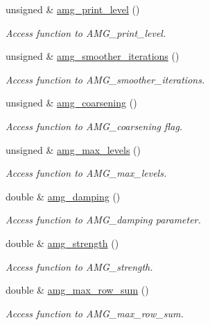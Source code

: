\begin{DoxyCompactItemize}
unsigned \& \hyperlink{classoomph_1_1HyprePreconditioner_a42a3de25133fa0816b98fcc493efc12c}{amg\+\_\+print\+\_\+level} ()
\begin{DoxyCompactList}\small\item\em Access function to A\+M\+G\+\_\+print\+\_\+level. \end{DoxyCompactList}\item 
unsigned \& \hyperlink{classoomph_1_1HyprePreconditioner_a03bb49bd0f7dabbc8ef39b9743d1dcf1}{amg\+\_\+smoother\+\_\+iterations} ()
\begin{DoxyCompactList}\small\item\em Access function to A\+M\+G\+\_\+smoother\+\_\+iterations. \end{DoxyCompactList}\item 
unsigned \& \hyperlink{classoomph_1_1HyprePreconditioner_ab830e0c945d5318c660cf0e2e2c9bc70}{amg\+\_\+coarsening} ()
\begin{DoxyCompactList}\small\item\em Access function to A\+M\+G\+\_\+coarsening flag. \end{DoxyCompactList}\item 
unsigned \& \hyperlink{classoomph_1_1HyprePreconditioner_a6bae8beb2e6bff788d083f1e2af4a47b}{amg\+\_\+max\+\_\+levels} ()
\begin{DoxyCompactList}\small\item\em Access function to A\+M\+G\+\_\+max\+\_\+levels. \end{DoxyCompactList}\item 
double \& \hyperlink{classoomph_1_1HyprePreconditioner_a3abdca331efaf5b2998e1b2056c925eb}{amg\+\_\+damping} ()
\begin{DoxyCompactList}\small\item\em Access function to A\+M\+G\+\_\+damping parameter. \end{DoxyCompactList}\item 
double \& \hyperlink{classoomph_1_1HyprePreconditioner_a1ec949391111062df52ac15f7dc81525}{amg\+\_\+strength} ()
\begin{DoxyCompactList}\small\item\em Access function to A\+M\+G\+\_\+strength. \end{DoxyCompactList}\item 
double \& \hyperlink{classoomph_1_1HyprePreconditioner_a0b2ea86dd7597bfd08b0e07f726c973d}{amg\+\_\+max\+\_\+row\+\_\+sum} ()
\begin{DoxyCompactList}\small\item\em Access function to A\+M\+G\+\_\+max\+\_\+row\+\_\+sum. \end{DoxyCompactList}\item 

\end{DoxyCompactItemize}
